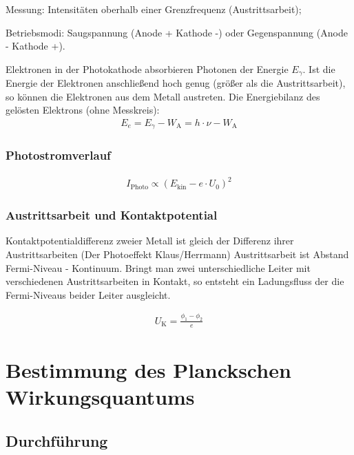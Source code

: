 \documentclass[11pt, a4paper]{article}
\numberwithin{equation}{section}
\begin{document}
Messung: Intensitäten oberhalb einer Grenzfrequenz (Austrittsarbeit);

Betriebsmodi: Saugspannung (Anode + Kathode -) oder Gegenspannung (Anode - Kathode +).


Elektronen in der Photokathode absorbieren Photonen der Energie $E_\gamma$.
Ist die Energie der Elektronen anschließend hoch genug (größer als die Austrittsarbeit), so können die Elektronen aus dem Metall austreten.
Die Energiebilanz des gelösten Elektrons (ohne Messkreis):
\begin{align}
E_e = E_\gamma - W_\mathrm{A} = h \cdot \nu - W_\mathrm{A}
\end{align}

\subsubsection{Photostromverlauf}

\begin{align}
	I_\mathrm{Photo} \propto (E_\mathrm{kin} - e \cdot U_0)^2
\end{align}

\subsubsection{Austrittsarbeit und Kontaktpotential}
Kontaktpotentialdifferenz zweier Metall ist gleich der Differenz ihrer Austrittsarbeiten (Der Photoeffekt Klaus/Herrmann)
Austrittsarbeit ist Abstand Fermi-Niveau - Kontinuum.
Bringt man zwei unterschiedliche Leiter mit verschiedenen Austrittsarbeiten in Kontakt, so entsteht ein Ladungsfluss der die Fermi-Niveaus beider Leiter ausgleicht.

\begin{align}
	U_\mathrm{K} = \frac{\phi_1 - \phi_2}{e}
\end{align}

\section{Bestimmung des Planckschen Wirkungsquantums}

\subsection{Durchführung}
\end{document}
